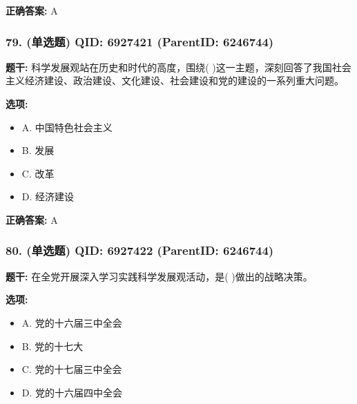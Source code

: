 \documentclass[12pt,UTF8]{ctexart}
\begin{document}
\textbf{正确答案:}
A

\vspace{0.3em}\hrulefill\vspace{0.7em}

\subsubsection*{79. (单选题) \small QID: 6927421 (ParentID: 6246744)}

\textbf{题干:}
科学发展观站在历史和时代的高度，围绕(  )这一主题，深刻回答了我国社会主义经济建设、政治建设、文化建设、社会建设和党的建设的一系列重大问题。



\textbf{选项:}
\begin{itemize}[leftmargin=*]

  \item A. 中国特色社会主义

  \item B. 发展

  \item C. 改革

  \item D. 经济建设

\end{itemize}

\textbf{正确答案:}
A

\vspace{0.3em}\hrulefill\vspace{0.7em}

\subsubsection*{80. (单选题) \small QID: 6927422 (ParentID: 6246744)}

\textbf{题干:}
在全党开展深入学习实践科学发展观活动，是(  )做出的战略决策。



\textbf{选项:}
\begin{itemize}[leftmargin=*]

  \item A. 党的十六届三中全会

  \item B. 党的十七大

  \item C. 党的十七届三中全会

  \item D. 党的十六届四中全会

\end{itemize}
\end{document}
